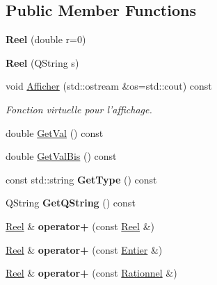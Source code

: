 \subsection*{Public Member Functions}
\begin{DoxyCompactItemize}
\item 
\hypertarget{class_reel_ad69ee401f9a73f16abacf65c849fbb7e}{{\bfseries Reel} (double r=0)}\label{class_reel_ad69ee401f9a73f16abacf65c849fbb7e}

\item 
\hypertarget{class_reel_ae3f4716794dd7c64e94ec56accc75dd9}{{\bfseries Reel} (Q\-String s)}\label{class_reel_ae3f4716794dd7c64e94ec56accc75dd9}

\item 
void \hyperlink{class_reel_a52eb23de069729bc2f8b8b2c18e1be7d}{Afficher} (std\-::ostream \&os=std\-::cout) const 
\begin{DoxyCompactList}\small\item\em Fonction virtuelle pour l'affichage. \end{DoxyCompactList}\item 
double \hyperlink{class_reel_a5755a5ed2d9042ad59984967dbddc7f5}{Get\-Val} () const 
\item 
double \hyperlink{class_reel_ab66ca2cb446b1cbc0c3565ff054acc1b}{Get\-Val\-Bis} () const 
\item 
\hypertarget{class_reel_ae36b25f3a050292cd6324c0f15dbfb2d}{const std\-::string {\bfseries Get\-Type} () const }\label{class_reel_ae36b25f3a050292cd6324c0f15dbfb2d}

\item 
\hypertarget{class_reel_a594333e01d25ecce1335cd25d7cd872e}{Q\-String {\bfseries Get\-Q\-String} () const }\label{class_reel_a594333e01d25ecce1335cd25d7cd872e}

\item 
\hypertarget{class_reel_a6a81e5a8d9d1d00e8ec75f4c1e6ca08b}{\hyperlink{class_reel}{Reel} \& {\bfseries operator+} (const \hyperlink{class_reel}{Reel} \&)}\label{class_reel_a6a81e5a8d9d1d00e8ec75f4c1e6ca08b}

\item 
\hypertarget{class_reel_afe46150ca2ed4f283cf7945d78c91365}{\hyperlink{class_reel}{Reel} \& {\bfseries operator+} (const \hyperlink{class_entier}{Entier} \&)}\label{class_reel_afe46150ca2ed4f283cf7945d78c91365}

\item 
\hypertarget{class_reel_a0b4d6f7d33108da029a89fd96a3ca765}{\hyperlink{class_reel}{Reel} \& {\bfseries operator+} (const \hyperlink{class_rationnel}{Rationnel} \&)}\label{class_reel_a0b4d6f7d33108da029a89fd96a3ca765}


\end{DoxyCompactItemize}
